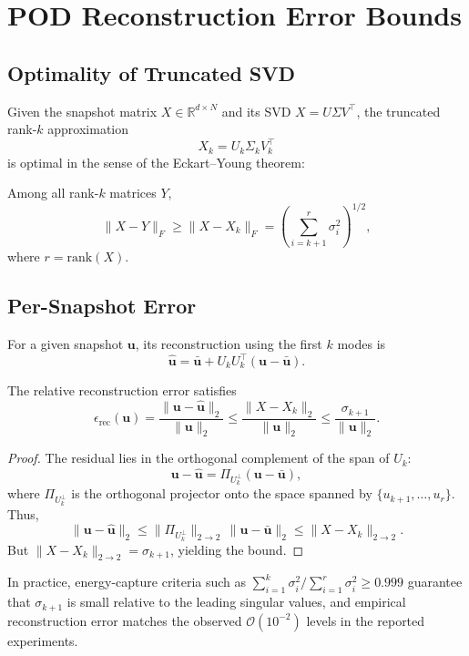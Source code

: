 \documentclass[11pt]{article}
\begin{document}
\section{POD Reconstruction Error Bounds}

\subsection{Optimality of Truncated SVD}

Given the snapshot matrix $X \in \mathbb{R}^{d \times N}$ and its SVD $X = U \Sigma V^\top$, the truncated rank-$k$ approximation
\[
  X_k = U_k \Sigma_k V_k^\top
\]
is optimal in the sense of the Eckart–Young theorem:

\begin{theorem}
Among all rank-$k$ matrices $Y$,
\[
  \|X - Y\|_F \ge \|X - X_k\|_F = \left(\sum_{i=k+1}^r \sigma_i^2\right)^{1/2},
\]
where $r = \mathrm{rank}(X)$.
\end{theorem}

\subsection{Per-Snapshot Error}

For a given snapshot $\bm{u}$, its reconstruction using the first $k$ modes is
\[
  \hat{\bm{u}} = \bar{\bm{u}} + U_k U_k^\top (\bm{u} - \bar{\bm{u}}).
\]

\begin{lemma}
The relative reconstruction error satisfies
\begin{equation}
  \epsilon_\mathrm{rec}(\bm{u}) = \frac{\|\bm{u} - \hat{\bm{u}}\|_2}{\|\bm{u}\|_2}
  \le \frac{\|X - X_k\|_2}{\|\bm{u}\|_2}
  \le \frac{\sigma_{k+1}}{\|\bm{u}\|_2}.
\end{equation}
\end{lemma}

\begin{proof}
The residual lies in the orthogonal complement of the span of $U_k$:
\[
  \bm{u} - \hat{\bm{u}} = \Pi_{U_k^\perp}(\bm{u} - \bar{\bm{u}}),
\]
where $\Pi_{U_k^\perp}$ is the orthogonal projector onto the space spanned by $\{u_{k+1},\dots,u_r\}$. Thus,
\[
  \|\bm{u} - \hat{\bm{u}}\|_2 \le \|\Pi_{U_k^\perp}\|_{2\to2} \, \|\bm{u} - \bar{\bm{u}}\|_2 \le \|X - X_k\|_{2\to2}.
\]
But $\|X - X_k\|_{2\to2} = \sigma_{k+1}$, yielding the bound.
\end{proof}

In practice, energy-capture criteria such as $\sum_{i=1}^k \sigma_i^2 / \sum_{i=1}^r \sigma_i^2 \ge 0.999$ guarantee that $\sigma_{k+1}$ is small relative to the leading singular values, and empirical reconstruction error matches the observed $\mathcal{O}(10^{-2})$ levels in the reported experiments.
\end{document}
